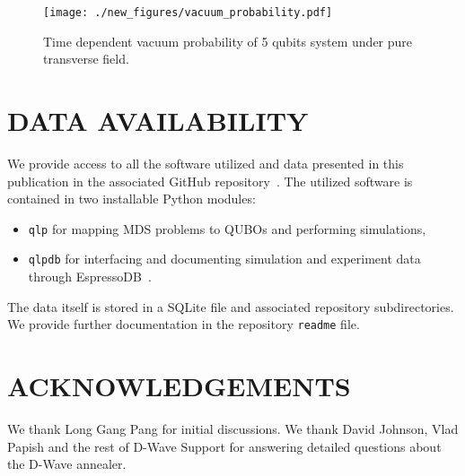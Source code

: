\documentclass[prd,twocolumn,tightenlines,preprintnumbers,showpacs,superscriptaddress,notitlepage,nofootinbib,eqsecnum,floatfix,longbibliography,aps,10pt]{revtex4-2}
\begin{document}
\begin{figure}
	\centering
	\texttt{[image: ./new\_figures/vacuum\_probability.pdf]}
	\caption{Time dependent vacuum probability of 5 qubits system under pure transverse field.}
	\label{figcheck}
\end{figure}


\section{DATA AVAILABILITY}
\label{sec:open-source}
We provide access to all the software utilized and data presented in this publication in the associated GitHub repository~\cite{github:cchang5/quantum_linear_programming}.
The utilized software is contained in two installable Python modules:
\begin{itemize}[leftmargin=*]
    \itemsep0em
    \item[] \texttt{qlp} for mapping MDS problems to QUBOs and performing simulations,
    \item[] \texttt{qlpdb} for interfacing and documenting simulation and experiment data through EspressoDB~\cite{Chang:2019khk}.
\end{itemize}
The data itself is stored in a SQLite file and associated repository subdirectories.
We provide further documentation in the repository \texttt{readme} file.


\section{ACKNOWLEDGEMENTS}

We thank Long Gang Pang for initial discussions.
We thank David Johnson, Vlad Papish and the rest of D-Wave Support for answering detailed questions about the D-Wave annealer.
\end{document}
